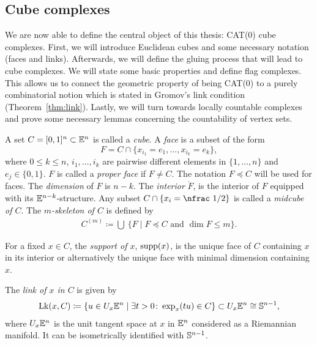 \subsection{Cube complexes}
\label{sec:complex}

We are now able to define the central object of this thesis: CAT(0) cube complexes. First, we will introduce Euclidean cubes and some necessary notation (faces and links). Afterwards, we will define the gluing process that will lead to cube complexes. We will state some basic properties and define flag complexes. This allows us to connect the geometric property of being CAT(0) to a purely combinatorial notion which is stated in Gromov's link condition (Theorem~\ref{thm:link}). Lastly, we will turn towards locally countable complexes and prove some necessary lemmas concerning the countability of vertex sets.

\begin{defin}[Cubes]
  A set \(C = [0,1]^n \subset \mathbb{E}^n\) is called a \emph{cube}. A \emph{face} is a subset of the form 
  \[
    F = C \cap \{x_{i_1} = e_1, \dots, x_{i_k} = e_k\},
  \]
  where \(0\leq k\leq n\), \(i_1, \dots, i_k\) are pairwise different elements in \(\{1, \dots, n\}\) and \(e_j \in \{0, 1\}\). \(F\) is called a \emph{proper face} if \(F \neq C\). The notation \(F \preceq C\) will be used for faces. The \emph{dimension} of \(F\) is \(n - k\). The \emph{interior} \(\mathring F\), is the interior of \(F\) equipped with its \(\mathbb{E}^{n-k}\)-structure. Any subset \(C \cap \{x_i = \text{\nfrac 1/2}\}\) is called a \emph{midcube of \(C\)}. The \emph{\(m\)-skeleton of \(C\)} is defined by
  \begin{align*}
    C^{(m)} \coloneqq \bigcup\ \{F \mid F \preceq C \text{ and } \dim F \leq m\}.
  \end{align*}

  For a fixed \(x \in C\), the \emph{support of \(x\)}, \(\operatorname{supp}(x)\), is the unique face of \(C\) containing \(x\) in its interior or alternatively the unique face with minimal dimension containing \(x\).

  The \emph{link of \(x\) in \(C\)} is given by
  \begin{align*}
    \operatorname{Lk}(x,C) \coloneqq \{u \in U_x\mathbb{E}^n \mid \exists t > 0 \colon \exp_x(tu) \in C\} \subset U_x\mathbb{E}^n \cong \mathbb{S}^{n-1},
  \end{align*}
  where \(U_x\mathbb{E}^n\) is the unit tangent space at \(x\) in \(\mathbb{E}^n\) considered as a Riemannian manifold. It can be isometrically identified with \(\mathbb{S}^{n-1}\).
\end{defin}

